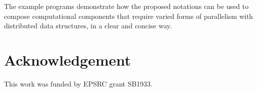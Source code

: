 \documentclass[11pt, conference, compsocconf, onecolumn]{IEEEtran}
\begin{document}
The example programs demonstrate how the proposed notations can be used to
compose computational components that require varied forms of parallelism with
distributed data structures, in a clear and concise way.


\section*{Acknowledgement}

This work was funded by EPSRC grant SB1933. 















\end{document}
